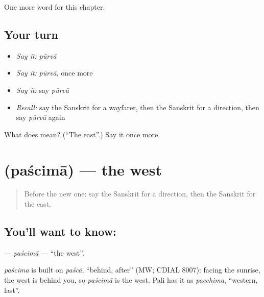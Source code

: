 \begin{grammarlens}[title={What you've built}]
One more word for this chapter.
\end{grammarlens}

\subsection*{Your turn}
\begin{itemize}
\raggedright
  \item \emph{Say it:} \emph{pūrvā}
  \item \emph{Say it:} \emph{pūrvā}, once more
  \item \emph{Say it:} say \emph{pūrvā}
  \item \emph{Recall:} say the Sanskrit for a wayfarer, then the Sanskrit for a direction, then say \emph{pūrvā} again
\end{itemize}

\begin{tcolorbox}[breakable,colback=teal!4,colframe=teal!35!black,title={Before you move on}]
What does  mean? (\textquotedblleft{}The east\textquotedblright{}.) Say it once more.
\end{tcolorbox}
\section[\texorpdfstring{\sk{पश्चिमा} (paścimā)}{पश्चिमा (paścimā)}]{ (paścimā) — the west}

\label{lesson:SA-C202-pascima}



\begin{quote}
Before the new one: say the Sanskrit for a direction, then the Sanskrit for the east.
\end{quote}

\subsection*{You'll want to know: }
\textbf{} — \emph{paścimā} — \textquotedblleft{}the west\textquotedblright{}.

\begin{cousinweb}
\emph{paścima} is built on \emph{paścā}, \textquotedblleft{}behind, after\textquotedblright{} (MW; CDIAL 8007): facing the sunrise, the west is behind you, so \emph{paścimā} is the west. Pali has it as \emph{pacchima}, \textquotedblleft{}western, last\textquotedblright{}.
\end{cousinweb}

